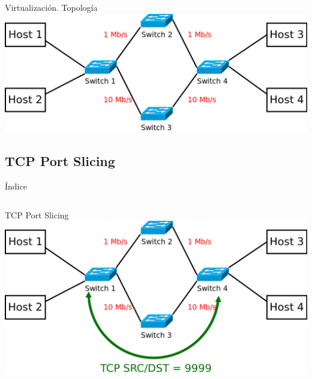 \documentclass{beamer}
\begin{document}
\begin{frame}{Virtualización. Topología}
    \centering
    \includegraphics[scale=0.23]{mininet_topology.png}
\end{frame}


\subsection{TCP Port Slicing}
\begin{frame}{Índice}
    \begin{columns}[t]
        \begin{column}{1.7in}
            \tableofcontents[currentsection, subsectionstyle=show/shaded/hide, sections={1-4}]
        \end{column}
        \begin{column}{1.7in}
            \tableofcontents[currentsection, subsectionstyle=show/shaded/hide, sections={5-7}]
        \end{column}
    \end{columns}
\end{frame}

\begin{frame}{TCP Port Slicing}
    \centering
    \includegraphics[scale=0.23]{mininet_topology_port_slicing.png}
\end{frame}
\end{document}
